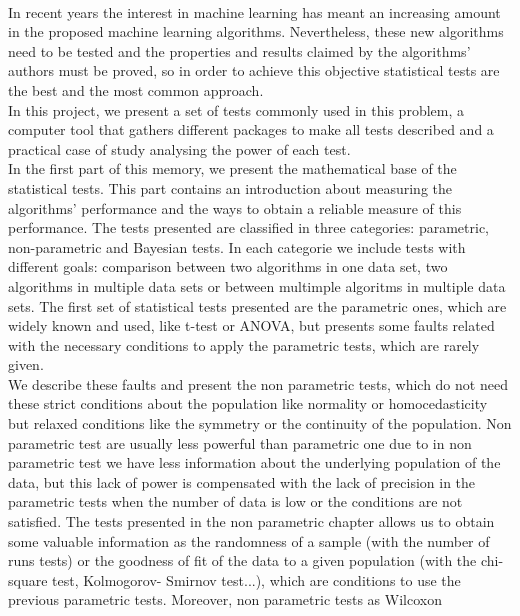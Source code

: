 \vspace{0.7cm}
\\

	In recent years the interest in machine learning has 
meant an increasing amount in the proposed machine learning 
algorithms. Nevertheless, these new algorithms need to be 
tested and the properties and results claimed by the 
algorithms’ authors must be proved, so in order to achieve 
this objective statistical tests are the best and the most 
common approach.\\
	In this project, we present a set of tests commonly used 
in this problem, a computer tool that gathers different 
packages to make all tests described and a practical case of 
study analysing the power of each test. \\
	In the first part of this memory, we present the 
mathematical base of the statistical tests. This part 
contains an introduction about measuring the algorithms’ 
performance and the ways to obtain a reliable measure of this 
performance. The tests presented are classified in three 
categories: parametric, non-parametric and Bayesian tests. In 
each categorie we include tests with different goals: 
comparison between two algorithms in one data set, two 
algorithms in multiple data sets or between multimple 
algoritms in multiple data sets. The first set of statistical 
tests presented are the parametric ones, which are widely 
known and used, like t-test or ANOVA, but presents some 
faults related with the necessary conditions to apply the 
parametric tests, which are rarely given. \\
	We describe these faults and present the non parametric 
tests, which do not need these strict conditions about the 
population like normality or homocedasticity but relaxed 
conditions like the symmetry or the continuity of the 
population. Non parametric test are usually less powerful 
than parametric one due to in non parametric test we have 
less information about the underlying population of the data, 
but this lack of power is compensated with the lack of 
precision in the parametric tests when the number of data is 
low or the conditions are not satisfied. The tests presented 
in the non parametric chapter allows us to obtain some 
valuable information as the randomness of a sample (with  the 
number of runs tests) or the goodness of fit of the data to a 
given population (with the chi-square test, Kolmogorov-
Smirnov test...), which are conditions to use the previous 
parametric tests. Moreover, non parametric tests as Wilcoxon 

